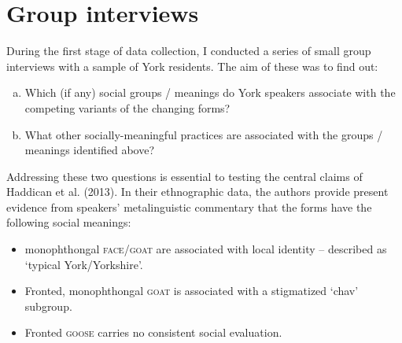 \documentclass{article}
\begin{document}




\newpage

\section*{Group interviews}

During the first stage of data collection, I conducted a series of small group interviews with a sample of York residents. The aim of these was to find out:

\begin{enumerate}[(a)]
\item{Which (if any) social groups / meanings do York speakers associate with the competing variants of the changing forms?}
\item{What other socially-meaningful practices are associated with the groups / meanings identified above?}
\end{enumerate}

Addressing these two questions is essential to testing the central claims of Haddican et al. (2013). In their ethnographic data, the authors provide present evidence from speakers' metalinguistic commentary that the forms have the following social meanings:

\begin{itemize}
\item{monophthongal \textsc{face}/\textsc{goat} are associated with local identity -- described as `typical York/Yorkshire'.}
\item{Fronted, monophthongal \textsc{goat} is associated with a stigmatized `chav' subgroup.}
\item{Fronted \textsc{goose} carries no consistent social evaluation.}
\end{itemize}
\end{document}
